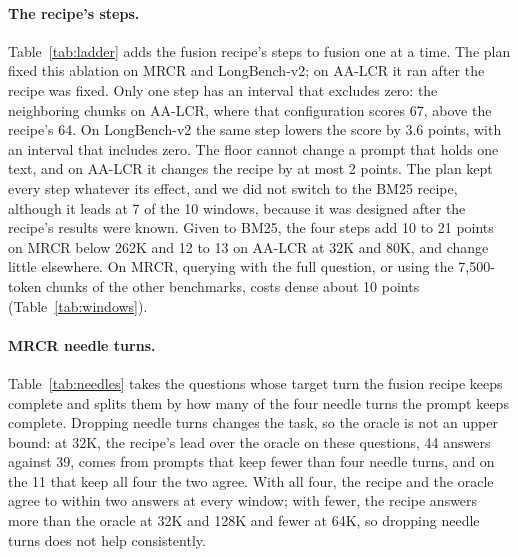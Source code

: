 \documentclass[letterpaper]{article} %
\newcommand{\recipe}{fusion recipe}
\begin{document}
\begin{table}[t]
\centering
\small

\caption{The policies at each benchmark's default window that the main text does not report, with middle truncation for reference. The three random seeds average 33.3, 38.9 and 42.5. Acc.\ and EM are percentages; $\Delta$ is the paired difference from middle truncation in points, with its 95\% bootstrap interval.}
\label{tab:other}
\end{table}

\paragraph{The recipe's steps.} Table~\ref{tab:ladder} adds the \recipe's steps to fusion one at a time. The plan fixed this ablation on MRCR and LongBench-v2; on AA-LCR it ran after the recipe was fixed. Only one step has an interval that excludes zero: the neighboring chunks on AA-LCR, where that configuration scores 67, above the recipe's 64. On LongBench-v2 the same step lowers the score by 3.6 points, with an interval that includes zero. The floor cannot change a prompt that holds one text, and on AA-LCR it changes the recipe by at most 2 points. The plan kept every step whatever its effect, and we did not switch to the BM25 recipe, although it leads at 7 of the 10 windows, because it was designed after the recipe's results were known. Given to BM25, the four steps add 10 to 21 points on MRCR below 262K and 12 to 13 on AA-LCR at 32K and 80K, and change little elsewhere. On MRCR, querying with the full question, or using the 7,500-token chunks of the other benchmarks, costs dense about 10 points (Table~\ref{tab:windows}).

\begin{table}[t]
\centering
\small

\caption{The cumulative ablation at each benchmark's default window. Each row adds one of the \recipe's steps to the row above, and the last row is the recipe. $\Delta$ is the paired difference from the row above in points, with its 95\% bootstrap interval.}
\label{tab:ladder}
\end{table}

\paragraph{MRCR needle turns.} Table~\ref{tab:needles} takes the questions whose target turn the \recipe{} keeps complete and splits them by how many of the four needle turns the prompt keeps complete. Dropping needle turns changes the task, so the oracle is not an upper bound: at 32K, the recipe's lead over the oracle on these questions, 44 answers against 39, comes from prompts that keep fewer than four needle turns, and on the 11 that keep all four the two agree. With all four, the recipe and the oracle agree to within two answers at every window; with fewer, the recipe answers more than the oracle at 32K and 128K and fewer at 64K, so dropping needle turns does not help consistently.
\end{document}
